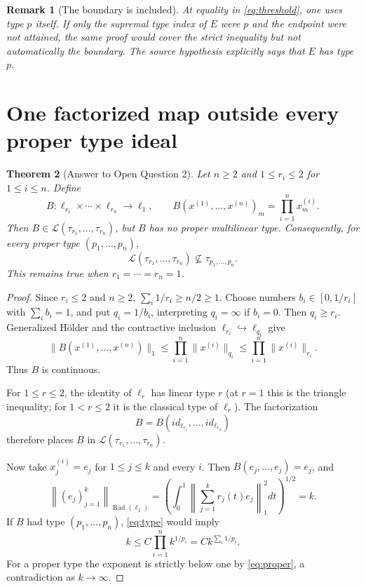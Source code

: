\documentclass[11pt]{article}
\newtheorem{theorem}{Theorem}
\newtheorem{remark}[theorem]{Remark}
\newcommand{\Rad}{\operatorname{Rad}}
\newcommand{\Lin}{\mathcal L}
\newcommand{\type}{\tau}
\begin{document}
\begin{remark}[The boundary is included]
At equality in \eqref{eq:threshold}, one uses type $p$ itself.  If only the
supremal type index of $E$ were $p$ and the endpoint were not attained, the
same proof would cover the strict inequality but not automatically the
boundary.  The source hypothesis explicitly says that $E$ has type $p$.
\end{remark}

\section{One factorized map outside every proper type ideal}

\begin{theorem}[Answer to Open Question 2]\label{thm:q2}
Let $n\ge2$ and $1\le r_i\le2$ for $1\le i\le n$.  Define
\begin{equation}\label{eq:coordinate-product}
 B:\ell_{r_1}\times\cdots\times\ell_{r_n}\longrightarrow\ell_1,
 \qquad
 B(x^{(1)},\ldots,x^{(n)})_m=\prod_{i=1}^n x_m^{(i)}.
\end{equation}
Then $B\in\Lin(\type_{r_1},\ldots,\type_{r_n})$, but $B$ has no proper
multilinear type.  Consequently, for every proper type
$(p_1,\ldots,p_n)$,
\[
 \Lin(\type_{r_1},\ldots,\type_{r_n})
 \not\subseteq\type_{p_1,\ldots,p_n}.
\]
This remains true when $r_1=\cdots=r_n=1$.
\end{theorem}

\begin{proof}
Since $r_i\le2$ and $n\ge2$,
$\sum_i1/r_i\ge n/2\ge1$.  Choose numbers
$b_i\in[0,1/r_i]$ with $\sum_i b_i=1$, and put
$q_i=1/b_i$, interpreting $q_i=\infty$ if $b_i=0$.
Then $q_i\ge r_i$.  Generalized H\"older and the contractive inclusion
$\ell_{r_i}\hookrightarrow\ell_{q_i}$ give
\begin{equation}\label{eq:bounded-B}
 \|B(x^{(1)},\ldots,x^{(n)})\|_1
 \le\prod_{i=1}^n\|x^{(i)}\|_{q_i}
 \le\prod_{i=1}^n\|x^{(i)}\|_{r_i}.
\end{equation}
Thus $B$ is continuous.

For $1\le r\le2$, the identity of $\ell_r$ has linear type $r$ (at
$r=1$ this is the triangle inequality; for $1<r\le2$ it is the classical
type of $\ell_r$).  The factorization
\[
 B=B(id_{\ell_{r_1}},\ldots,id_{\ell_{r_n}})
\]
therefore places $B$ in
$\Lin(\type_{r_1},\ldots,\type_{r_n})$.

Now take $x_j^{(i)}=e_j$ for $1\le j\le k$ and every $i$.  Then
$B(e_j,\ldots,e_j)=e_j$, and
\begin{equation}\label{eq:rad-l1}
 \left\|(e_j)_{j=1}^k\right\|_{\Rad(\ell_1)}
 =\left(\int_0^1\left\|\sum_{j=1}^k r_j(t)e_j\right\|_1^2dt\right)^{1/2}
 =k.
\end{equation}
If $B$ had type $(p_1,\ldots,p_n)$, \eqref{eq:type} would imply
\[
 k\le C\prod_{i=1}^n k^{1/p_i}
 =Ck^{\sum_i1/p_i}.
\]
For a proper type the exponent is strictly below one by
\eqref{eq:proper}, a contradiction as $k\to\infty$.
\end{proof}
\end{document}
